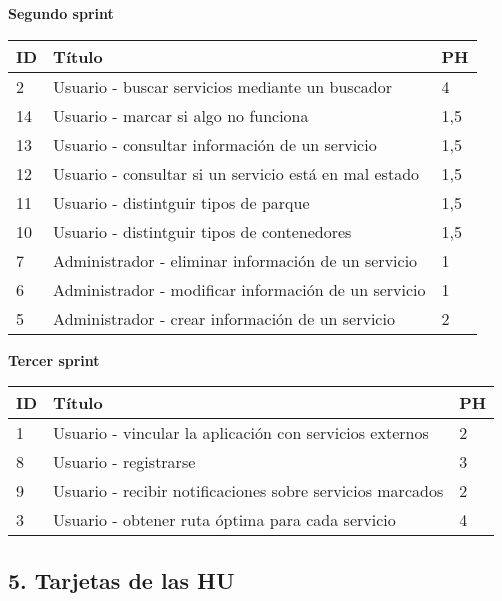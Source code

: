 \documentclass[]{article}
\begin{document}
\textbf{Segundo sprint}

\begin{longtable}[]{@{}lll@{}}
\toprule
ID & Título & PH\tabularnewline
\midrule
\endhead
2 & Usuario - buscar servicios mediante un buscador & 4\tabularnewline
14 & Usuario - marcar si algo no funciona & 1,5\tabularnewline
13 & Usuario - consultar información de un servicio & 1,5\tabularnewline
12 & Usuario - consultar si un servicio está en mal estado &
1,5\tabularnewline
11 & Usuario - distintguir tipos de parque & 1,5\tabularnewline
10 & Usuario - distintguir tipos de contenedores & 1,5\tabularnewline
7 & Administrador - eliminar información de un servicio &
1\tabularnewline
6 & Administrador - modificar información de un servicio &
1\tabularnewline
5 & Administrador - crear información de un servicio & 2\tabularnewline
\bottomrule
\end{longtable}

\textbf{Tercer sprint}

\begin{longtable}[]{@{}lll@{}}
\toprule
ID & Título & PH\tabularnewline
\midrule
\endhead
1 & Usuario - vincular la aplicación con servicios externos &
2\tabularnewline
8 & Usuario - registrarse & 3\tabularnewline
9 & Usuario - recibir notificaciones sobre servicios marcados &
2\tabularnewline
3 & Usuario - obtener ruta óptima para cada servicio & 4\tabularnewline
\bottomrule
\end{longtable}

\subsection{5. Tarjetas de las HU}\label{tarjetas-de-las-hu}
\end{document}
